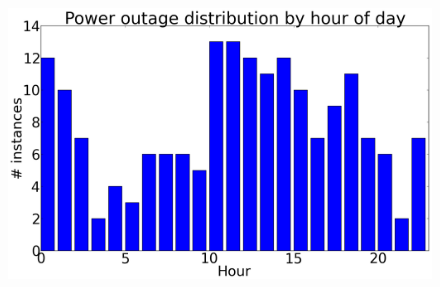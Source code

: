 \documentclass[10pt]{sensys-proc}
\begin{document}
\begin{figure}[t!]
{             \includegraphics[scale=0.14]{./figures/outage_by_hour.png}}
              \vspace{-4mm}
             \newline
            

\end{figure}
\end{document}
